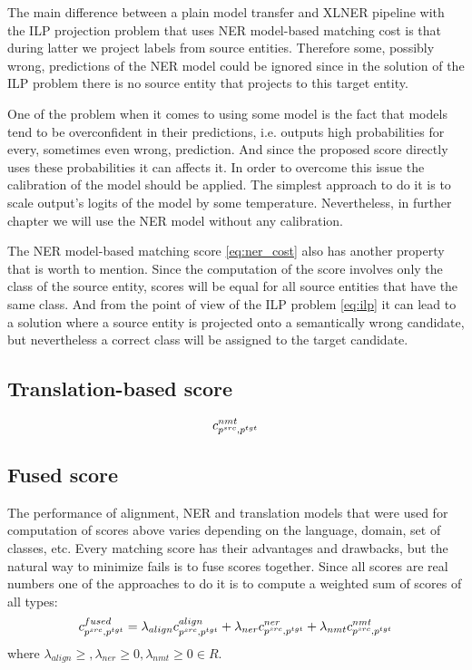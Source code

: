 The main difference between a plain model transfer and XLNER pipeline with the ILP projection problem that uses NER model-based
matching cost is that during latter we project labels from source entities. Therefore some, possibly wrong, predictions of the
NER model could be ignored since in the solution of the ILP problem there is no source entity that projects
to this target entity.

One of the problem when it comes to using some model is the fact that models tend to be overconfident in their
predictions, i.e. outputs high probabilities for every, sometimes even wrong, prediction. And since the
proposed score directly uses these probabilities it can affects it. In order to overcome this issue the
calibration of the model should be applied. The simplest approach to do it is to scale output's logits of the
model by some temperature. Nevertheless, in further chapter we will use the NER model without any calibration.

The NER model-based matching score \eqref{eq:ner_cost} also has another property that is worth to mention.
Since the computation of the score involves only the class of the source entity, scores will be equal
for all source entities that have the same class. And from the point of view of the ILP problem
\eqref{eq:ilp} it can lead to a solution where a source entity is projected onto a semantically wrong candidate, but
nevertheless a correct class will be assigned to the target candidate.

\subsection{Translation-based score}


\begin{equation} \label{eq:nmt_cost}
    c_{p^{src}, p^{tgt}}^{nmt}
\end{equation}

\subsection{Fused score}
The performance of alignment, NER and translation models that were used for computation of
scores above varies depending on the language, domain, set of classes, etc.
Every matching score has their advantages and drawbacks, but the natural way to minimize fails is
to fuse scores together. Since all scores are real numbers one of the approaches to do it is to compute a
weighted sum of scores of all types:
\begin{equation} \label{eq:fused_cost}
    c_{p^{src}, p^{tgt}}^{fused} =
    \lambda_{align} c_{p^{src}, p^{tgt}}^{align} +
    \lambda_{ner} c_{p^{src}, p^{tgt}}^{ner} +
    \lambda_{nmt} c_{p^{src}, p^{tgt}}^{nmt}
\end{equation}
where \( \lambda_{align} \geq, \lambda_{ner} \geq 0, \lambda_{nmt} \geq 0 \in R\).

